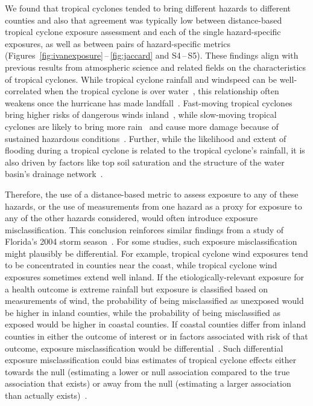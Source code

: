 We found that tropical cyclones tended to bring different hazards to different
counties and also that agreement was typically low between distance-based
tropical cyclone exposure assessment and each of the single hazard-specific
exposures, as well as between pairs of hazard-specific metrics
(Figures~\ref{fig:ivanexposure}\,--\,\ref{fig:jaccard} and S4\,--\,S5).  These
findings align with previous results from atmospheric science and related
fields on the characteristics of tropical cyclones. While tropical cyclone
rainfall and windspeed can be well-correlated when the tropical cyclone is over
water~\parencite{cerveny2000}, this relationship often weakens once the
hurricane has made landfall~\parencite{jiang2008}.  Fast-moving tropical
cyclones bring higher risks of dangerous winds inland~\parencite{kruk2010},
while slow-moving tropical cyclones are likely to bring more
rain~\parencite{rappaport2000} and cause more damage because of sustained
hazardous conditions~\parencite{rezapour2014}. Further, while the likelihood
and extent of flooding during a tropical cyclone is related to the tropical
cyclone's rainfall, it is also driven by factors like top soil saturation and
the structure of the water basin's drainage network~\parencite{chen2015,
rees2001}. 

Therefore, the use of a distance-based metric to assess exposure to any of
these hazards, or the use of measurements from one hazard as a proxy for
exposure to any of the other hazards considered, would often introduce exposure
misclassification. This conclusion reinforces similar findings from a study of
Florida's 2004 storm season~\parencite{grabich2015measuring}.  For some
studies, such exposure misclassification might plausibly be differential.  For
example, tropical cyclone wind exposures tend to be concentrated in counties
near the coast, while tropical cyclone wind exposures sometimes extend well
inland.  If the etiologically-relevant exposure for a health outcome is extreme
rainfall but exposure is classified based on measurements of wind, the
probability of being misclassified as unexposed would be higher in inland
counties, while the probability of being misclassified as exposed would be
higher in coastal counties. If coastal counties differ from inland counties in
either the outcome of interest or in factors associated with risk of that
outcome, exposure misclassification would be
differential~\parencite{savitz2016interpreting}.  Such differential exposure
misclassification could bias estimates of tropical cyclone effects either
towards the null (estimating a lower or null association compared to the true
association that exists) or away from the null (estimating a larger association
than actually exists)~\parencite{savitz2016interpreting, armstrong1998effect}.  

